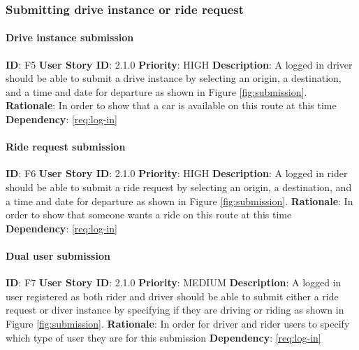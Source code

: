 \documentclass{article}
\begin{document}
\subsubsection{Submitting drive instance or ride request}

\paragraph{Drive instance submission}\label{req:driveInstance}
\textbf{ID}: F5\newline
\textbf{User Story ID}: 2.1.0\newline
\textbf{Priority}: HIGH\newline
\textbf{Description}: A logged in driver should be able to submit a drive instance by selecting an origin, a destination, and a time and date for departure as shown in Figure \ref{fig:submission}. \newline
\textbf{Rationale}: In order to show that a car is available on this route at this time\newline
\textbf{Dependency}: \ref{req:log-in}\newline

\paragraph{Ride request submission}\label{req:rideRequest}
\textbf{ID}: F6\newline
\textbf{User Story ID}: 2.1.0\newline
\textbf{Priority}: HIGH\newline
\textbf{Description}: A logged in rider should be able to submit a ride request by selecting an origin, a destination, and a time and date for departure as shown in Figure \ref{fig:submission}. \newline
\textbf{Rationale}: In order to show that someone wants a ride on this route at this time\newline
\textbf{Dependency}: \ref{req:log-in}\newline

\paragraph{Dual user submission}\label{req:dualSubmission}
\textbf{ID}: F7\newline
\textbf{User Story ID}: 2.1.0\newline
\textbf{Priority}: MEDIUM\newline
\textbf{Description}: A logged in user registered as both rider and driver should be able to submit either a ride request or diver instance by specifying if they are driving or riding as shown in Figure \ref{fig:submission}. \newline
\textbf{Rationale}: In order for driver and rider users to specify which type of user they are for this submission\newline
\textbf{Dependency}: \ref{req:log-in}\newline
\end{document}
